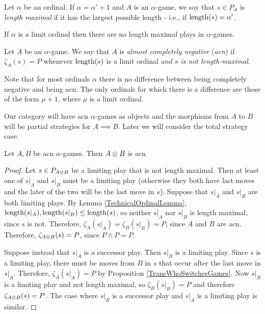 \documentclass[11pt]{article} %
\begin{document}
\begin{definition}
  Let $\alpha$ be an ordinal.  If $\alpha=\alpha'+1$ and $A$ is an $\alpha$-game, we say that $s\in P_A$ is \emph{length maximal} if it has the largest possible length - i.e., if $\operatorname{length}(s)=\alpha'$.  

  If $\alpha$ is a limit ordinal then there are no length maximal plays in $\alpha$-games.

  Let $A$ be an $\alpha$-game.  We say that $A$ is \emph{almost completely negative} (\emph{acn}) if $\zeta_A(s)=P$ whenever $\operatorname{length}(s)$ is a limit ordinal \emph{and $s$ is not length-maximal}.
\end{definition}

Note that for most ordinals $\alpha$ there is no difference between being completely negative and being acn.  The only ordinals for which there is  a difference are those of the form $\mu+1$, where $\mu$ is a limit ordinal.  

Our category will have acn $\alpha$-games as objects and the morphisms from $A$ to $B$ will be partial strategies for $A\implies B$.  Later we will consider the total strategy case.

\begin{proposition}
  \label{TensorIsAcn}
  Let $A,B$ be acn $\alpha$-games.  Then $A\otimes B$ is acn
  \begin{proof}
    Let $s\in P_{A\otimes B}$ be a limiting play that is not length maximal.  Then at least one of $s\vert_A$ and $s\vert_B$ must be a limiting play (otherwise they both have last moves and the later of the two will be the last move in $s$).  Suppose that $s\vert_A$ and $s\vert_B$ are both limiting plays.  By Lemma \ref{TechnicalOrdinalLemma}, $\operatorname{length}(s\vert_A),\operatorname{length}(s\vert_B)\le\operatorname{length}(s)$, so neither $s\vert_A$ nor $s\vert_B$ is length maximal, since $s$ is not.  Therefore, $\zeta_A(s\vert_A)=\zeta_B(s\vert_B)=P$, since $A$ and $B$ are acn.  Therefore, $\zeta_{A\otimes B}(s)=P$, since $P\wedge P=P$.

    Suppose instead that $s\vert_A$ is a successor play.  Then $s\vert_B$ is a limiting play.  Since $s$ is a limiting play, there must be moves from $B$ in $s$ that occur after the last move in $s\vert_A$.  Therefore, $\zeta_A(s\vert_A)=P$ by Proposition \ref{TransWhoSwitchesGames}.  Now $s\vert_B$ is a limiting play and not length maximal, so $\zeta_B(s\vert_B)=P$ and therefore $\zeta_{A\otimes B}(s)=P$.  The case where $s\vert_B$ is a successor play and $s\vert_A$ is a limiting play is similar.
  \end{proof}
\end{proposition}
\end{document}
